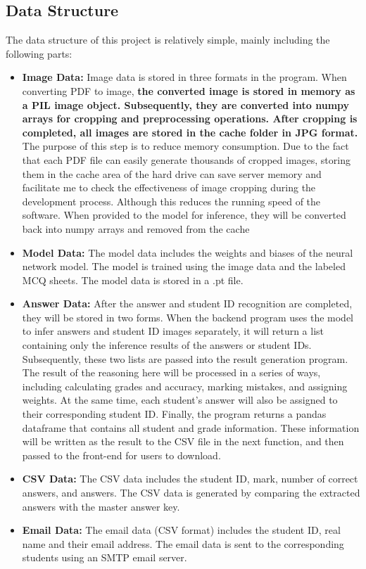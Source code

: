 \documentclass[twocolumn]{article}
\begin{document}
    \subsection{Data Structure}
    The data structure of this project is relatively simple, mainly including the following parts:
    \begin{itemize}
        \item \textbf{Image Data:} Image data is stored in three formats in the program. When converting PDF to image, \textbf{the converted image is stored in memory as a PIL image object. Subsequently, they are converted into numpy arrays for cropping and preprocessing operations. After cropping is completed, all images are stored in the cache folder in JPG format.} The purpose of this step is to reduce memory consumption. Due to the fact that each PDF file can easily generate thousands of cropped images, storing them in the cache area of the hard drive can save server memory and facilitate me to check the effectiveness of image cropping during the development process. Although this reduces the running speed of the software. When provided to the model for inference, they will be converted back into numpy arrays and removed from the cache
        \item \textbf{Model Data:} The model data includes the weights and biases of the neural network model. The model is trained using the image data and the labeled MCQ sheets. The model data is stored in a .pt file.
        \item \textbf{Answer Data:} After the answer and student ID recognition are completed, they will be stored in two forms. When the backend program uses the model to infer answers and student ID images separately, it will return a list containing only the inference results of the answers or student IDs. Subsequently, these two lists are passed into the result generation program. The result of the reasoning here will be processed in a series of ways, including calculating grades and accuracy, marking mistakes, and assigning weights. At the same time, each student's answer will also be assigned to their corresponding student ID. Finally, the program returns a pandas dataframe that contains all student and grade information. These information will be written as the result to the CSV file in the next function, and then passed to the front-end for users to download.
        \item \textbf{CSV Data:} The CSV data includes the student ID, mark, number of correct answers, and answers. The CSV data is generated by comparing the extracted answers with the master answer key.
        \item \textbf{Email Data:} The email data (CSV format) includes the student ID, real name and their email address. The email data is sent to the corresponding students using an SMTP email server.
    \end{itemize}
\end{document}
